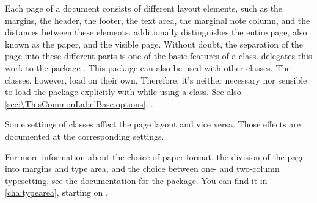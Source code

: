 Each page of a document consists of different layout elements, such as the
margins, the header, the footer, the text area, the marginal note column, and
the distances between these elements. \KOMAScript{} additionally distinguishes
the entire page, also known as the paper, and the visible page. Without doubt,
the separation of the page into these different parts is one of the basic
features of a class.
\KOMAScript{} delegates this work to the package
\hyperref[cha:typearea]{}. This
package can also be used with other classes. The \KOMAScript{} classes,
however, load  on their own. Therefore, it's neither
necessary nor sensible to load the package explicitly with 
while using a \KOMAScript{} class. See also
\autoref{sec:\ThisCommonLabelBase.options},
.

Some settings of \KOMAScript{} classes affect the page layout and vice versa.
Those effects are documented at the corresponding settings.

For more information about the choice of paper format, the division of the
page into margins and type area, and the choice between one- and two-column
typesetting, see the documentation for the
\hyperref[cha:typearea]{}
package. You can find it in \autoref{cha:typearea}, starting on
.

